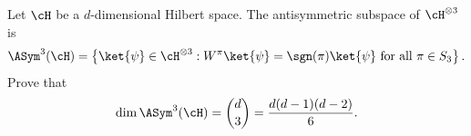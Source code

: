 Let $\cH$ be a $d$-dimensional Hilbert space. The antisymmetric subspace of $\cH^{\otimes3}$ is
$$
\ASym^3(\cH)
=
\left\{
\ket{\psi}\in\cH^{\otimes3}:
W^\pi\ket{\psi}=\sgn(\pi)\ket{\psi}\text{ for all }\pi\in S_3
\right\}.
$$
Prove that
$$
\dim\ASym^3(\cH)
=
\binom{d}{3}
=
\frac{d(d-1)(d-2)}{6}.
$$
